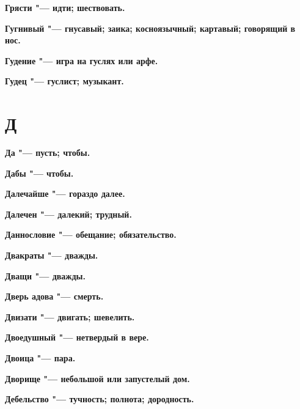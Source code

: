 \begin{mymulticols}{2}
\bfseries Грясти\normalfont{} "--- идти; шествовать. 




\bfseries Гугнивый\normalfont{} "--- гнусавый; заика; косноязычный; картавый; говорящий в нос. 




\bfseries Гудение\normalfont{} "--- игра на гуслях или арфе. 




\bfseries Гудец\normalfont{} "--- гуслист; музыкант. 




\section{Д} 





\bfseries Да\normalfont{} "--- пусть; чтобы. 




\bfseries Дабы\normalfont{} "--- чтобы. 




\bfseries Далечайше\normalfont{} "--- гораздо далее. 




\bfseries Далечен\normalfont{} "--- далекий; трудный. 




\bfseries Даннословие\normalfont{} "--- обещание; обязательство. 




\bfseries Двакраты\normalfont{} "--- дважды. 




\bfseries Дващи\normalfont{} "--- дважды. 




\bfseries Дверь адова\normalfont{} "--- смерть. 




\bfseries Двизати\normalfont{} "--- двигать; шевелить. 




\bfseries Двоедушный\normalfont{} "--- нетвердый в вере. 




\bfseries Двоица\normalfont{} "--- пара. 




\bfseries Дворище\normalfont{} "--- небольшой или запустелый дом. 




\bfseries Дебельство\normalfont{} "--- тучность; полнота; дородность. 





\end{mymulticols}
